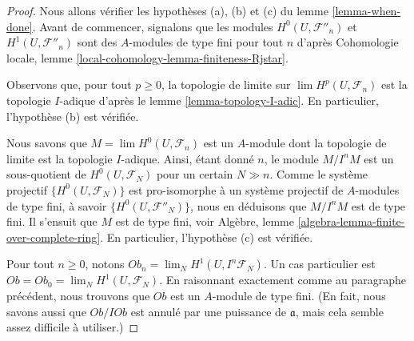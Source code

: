 \begin{proof}
Nous allons vérifier les hypothèses (a), (b) et (c) du lemme \ref{lemma-when-done}.
Avant de commencer, signalons que les modules
$H^0(U, \mathcal{F}''_n)$ et $H^1(U, \mathcal{F}''_n)$
sont des $A$-modules de type fini pour tout $n$ d'après
Cohomologie locale, lemme \ref{local-cohomology-lemma-finiteness-Rjstar}.

\medskip\noindent
Observons que, pour tout $p \geq 0$,
la topologie de limite sur $\lim H^p(U, \mathcal{F}_n)$
est la topologie $I$-adique d'après le lemme \ref{lemma-topology-I-adic}.
En particulier, l'hypothèse (b) est vérifiée.

\medskip\noindent
Nous savons que $M = \lim H^0(U, \mathcal{F}_n)$ est un $A$-module dont la
topologie de limite est la topologie $I$-adique. Ainsi, étant donné $n$, le module
$M/I^nM$ est un sous-quotient de $H^0(U, \mathcal{F}_N)$ pour un certain $N \gg n$.
Comme le système projectif $\{H^0(U, \mathcal{F}_N)\}$ est pro-isomorphe à un
système projectif de $A$-modules de type fini, à savoir $\{H^0(U, \mathcal{F}''_N)\}$,
nous en déduisons que $M/I^nM$ est de type fini. Il s'ensuit que $M$ est de type fini, voir
Algèbre, lemme \ref{algebra-lemma-finite-over-complete-ring}.
En particulier, l'hypothèse (c) est vérifiée.

\medskip\noindent
Pour tout $n \geq 0$, notons $Ob_n = \lim_N H^1(U, I^n\mathcal{F}_N)$.
Un cas particulier est $Ob = Ob_0 = \lim_N H^1(U, \mathcal{F}_N)$.
En raisonnant exactement comme au paragraphe précédent, nous trouvons que $Ob$
est un $A$-module de type fini. (En fait, nous savons aussi que $Ob/I Ob$ est annulé
par une puissance de $\mathfrak a$, mais cela semble assez difficile à utiliser.)


\end{proof}
